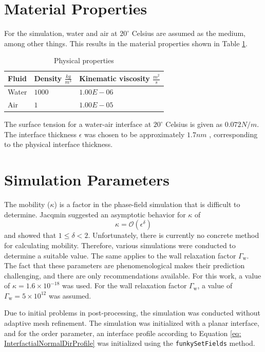 \section{Material Properties}
For the simulation, water and air at $20^{\circ}$ Celsius are assumed as the medium, among other things. This results in the material properties shown in Table \ref{tab:physicalProperties_CaseSetup}.
\begin{table}[h]
    \centering
    \caption{Physical properties}
    \label{tab:physicalProperties_CaseSetup}
    \begin{tabular}{lll}
        Fluid & Density $\frac{kg}{m^3}$ & Kinematic viscosity $\frac{m^2}{s}$ \\ \hline
        Water & $1000$ & $1.00E-06$ \\
        Air & $1$ & $1.00E-05$ \\
    \end{tabular}
\end{table}
The surface tension for a water-air interface at $20^{\circ}$ Celsius is given as \(0.072 N/m\). The interface thickness \( \epsilon \) was chosen to be approximately \(1.7 nm\) \cite{bagheriInterfacialRelaxationCrucial2022}, corresponding to the physical interface thickness.


\section{Simulation Parameters}
The mobility ($\kappa$) is a factor in the phase-field simulation that is difficult to determine. Jacqmin \cite{jacqmin1999CalculationTwoPhaseNavier} suggested an asymptotic behavior for \( \kappa \) of 
\begin{equation}
    \kappa = \mathcal{O}(\epsilon^{\delta})
\end{equation}
and showed that \( 1 \leq \delta < 2 \). Unfortunately, there is currently no concrete method for calculating mobility. Therefore, various simulations were conducted to determine a suitable value. The same applies to the wall relaxation factor $\Gamma_{\mathrm{w}}$. The fact that these parameters are phenomenological makes their prediction challenging, and there are only recommendations available.
For this work, a value of \( \kappa = 1.6 \times 10^{-18} \) was used. For the wall relaxation factor $\Gamma_{\mathrm{w}}$, a value of \( \Gamma_{\mathrm{w}} = 5 \times 10^{12} \) was assumed. 

Due to initial problems in post-processing, the simulation was conducted without adaptive mesh refinement.
The simulation was initialized with a planar interface, and for the order parameter, an interface profile according to Equation \ref{eq: InterfactialNormalDirProfile} was initialized using the \verb|funkySetFields| method.

